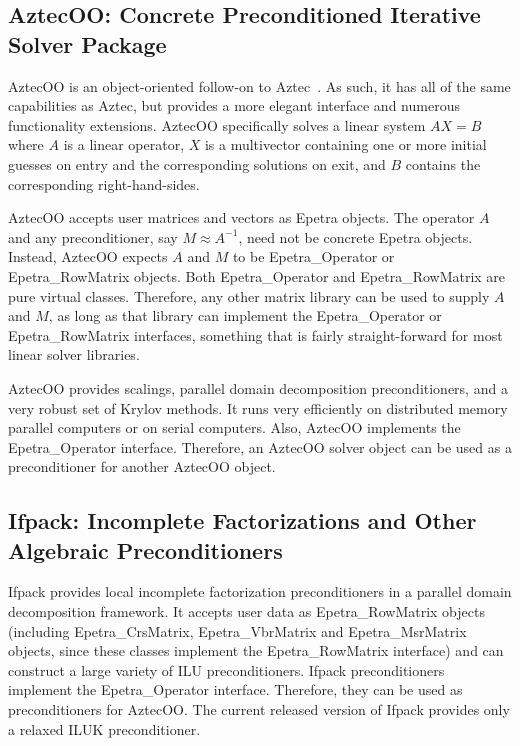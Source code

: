 \documentclass[12pt,relax]{SANDreport}
\begin{document}
\subsection{AztecOO: Concrete Preconditioned Iterative Solver Package}

AztecOO is an object-oriented follow-on to Aztec~\cite{Aztec2.1}.  As such, it has
all of the same capabilities as Aztec, but provides a more elegant interface and numerous functionality
extensions.  AztecOO specifically solves a linear system $AX=B$ where $A$ is a linear 
operator, $X$ is a multivector containing one or more initial guesses on entry and the
corresponding solutions on exit, and $B$ contains the corresponding right-hand-sides.

AztecOO accepts user matrices and vectors as Epetra objects.  The operator $A$ and any
preconditioner, say $M \approx A^{-1}$, need not be concrete Epetra objects.
Instead, AztecOO expects $A$ and $M$ to be Epetra\_Operator or Epetra\_RowMatrix objects. 
Both Epetra\_Operator and Epetra\_RowMatrix are pure virtual classes.  Therefore, any other
matrix library can be used to supply $A$ and $M$, as long as that library can implement
the  Epetra\_Operator or Epetra\_RowMatrix interfaces, something that is fairly straight-forward
 for most linear solver libraries.

AztecOO provides scalings, parallel domain decomposition preconditioners, and a very robust
set of Krylov methods.  It runs very efficiently on distributed memory parallel computers or
on serial computers.  Also, AztecOO implements the Epetra\_Operator interface.  Therefore,
an AztecOO solver object can be used as a preconditioner for another AztecOO object.

\subsection{Ifpack: Incomplete Factorizations and Other Algebraic Preconditioners}

Ifpack provides local incomplete factorization preconditioners in a
parallel domain decomposition framework.  It accepts user data as Epetra\_RowMatrix objects
(including Epetra\_CrsMatrix, Epetra\_VbrMatrix and Epetra\_MsrMatrix objects, since these
classes implement the Epetra\_RowMatrix interface)
and can construct a large variety of ILU preconditioners.  Ifpack preconditioners implement
the Epetra\_Operator interface.  Therefore, they can be used as preconditioners for AztecOO.
The current released version of Ifpack provides only a relaxed ILUK preconditioner.
\end{document}
